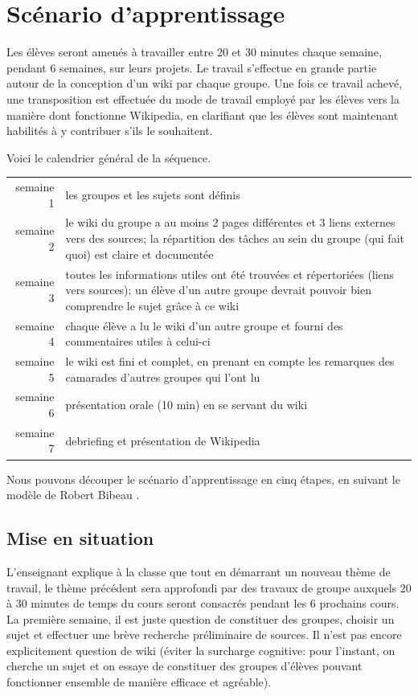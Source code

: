 \documentclass[11pt,bibliography=totoc]{scrartcl}
\begin{document}
\section{Scénario d'apprentissage}
Les élèves seront amenés à travailler entre 20 et 30 minutes chaque semaine,
pendant 6 semaines, sur leurs projets. Le travail s'effectue en grande partie
autour de la conception d'un wiki par chaque groupe. Une fois ce travail achevé,
une transposition est effectuée du mode de travail employé par les élèves vers
la manière dont fonctionne Wikipedia, en clarifiant que les élèves sont
maintenant habilités à y contribuer s'ils le souhaitent.

Voici le calendrier général de la séquence.
\begin{center}
\begin{tabular}{rp{}}
  semaine 1& les groupes et les sujets sont définis\\
  semaine 2& le wiki du groupe a au moins 2 pages différentes et 3 liens
             externes vers des sources;
             la répartition des tâches au sein du groupe (qui fait quoi) est claire et documentée\\
  semaine 3& toutes les informations utiles ont été trouvées et répertoriées
             (liens vers sources);
             un élève d'un autre groupe devrait pouvoir bien comprendre le sujet grâce à ce wiki\\
  semaine 4& chaque élève a lu le wiki d'un autre groupe et fourni des commentaires utiles à celui-ci\\
  semaine 5& le wiki est fini et complet, en prenant en compte les remarques des
             camarades d'autres groupes qui l'ont lu\\
  semaine 6& présentation orale (10 min) en se servant du wiki \\
  semaine 7& debriefing et présentation de Wikipedia
\end{tabular}  
\end{center}

Nous pouvons découper le scénario d'apprentissage en cinq étapes, en suivant le
modèle de Robert Bibeau \autocite{bibeau}.

\subsection{Mise en situation}
L'enseignant explique à la classe que tout en démarrant un nouveau thème de
travail, le thème précédent sera approfondi par des travaux de groupe auxquels
20 à 30 minutes de temps du cours seront consacrés pendant les 6 prochains cours.
La première semaine, il est juste question de constituer des groupes, choisir un
sujet et effectuer une brève recherche préliminaire de sources. Il n'est pas
encore explicitement question de wiki (éviter la surcharge cognitive: pour
l'instant, on cherche un sujet et on essaye de constituer des groupes d'élèves
pouvant fonctionner ensemble de manière efficace et agréable).
\end{document}
